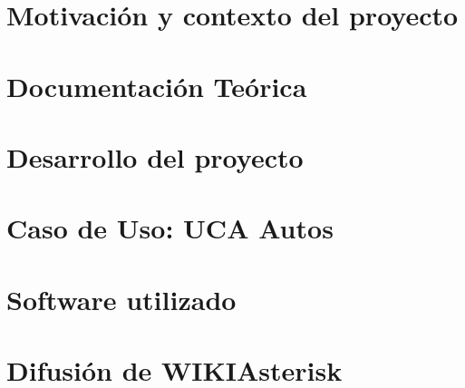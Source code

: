 \documentclass[a4paper,11pt]{book}
\begin{document}
\renewcommand{\listfigurename}{Indice de figuras}
\renewcommand{\tablename}{Tabla}
\renewcommand{\listtablename}{Indice de tablas}


\pagestyle{empty}

\cleardoublepage


\cleardoublepage
\pagestyle{plain}

\frontmatter %


\cleardoublepage

\tableofcontents
\listoffigures
\listoftables

\mainmatter %

\chapter{Motivación y contexto del proyecto}

\chapter{Documentación Teórica}


\chapter{Desarrollo del proyecto}


\chapter{Caso de Uso: UCA Autos}



\backmatter %

\clearpage
{}



\chapter*{Software utilizado}


\chapter*{Difusión de WIKIAsterisk}\label{cap:difusion}



\end{document}
